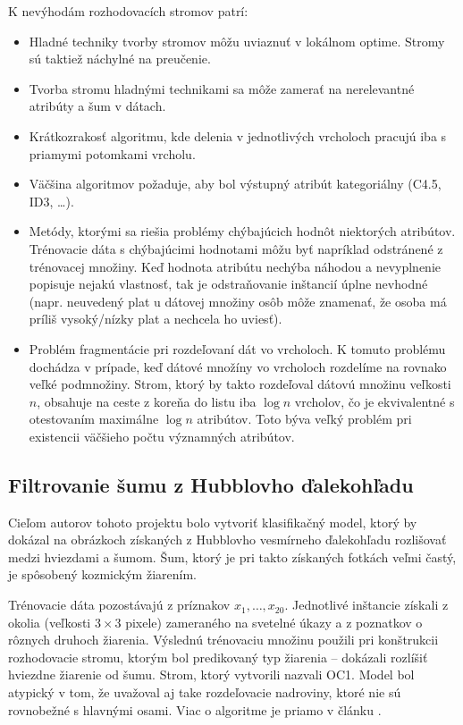 K nevýhodám rozhodovacích stromov patrí:
\begin{itemize}
\item Hladné techniky tvorby stromov môžu uviaznuť v lokálnom optime. Stromy sú taktiež náchylné na preučenie.
\item Tvorba stromu hladnými technikami sa môže zamerať na nerelevantné atribúty a šum v dátach.
\item Krátkozrakosť algoritmu, kde delenia v jednotlivých vrcholoch pracujú iba s priamymi potomkami vrcholu.
\item Väčšina algoritmov požaduje, aby bol výstupný atribút kategoriálny (C4.5, ID3, \ldots).
\item Metódy, ktorými sa riešia problémy chýbajúcich hodnôt niektorých atribútov. Trénovacie dáta s chýbajúcimi hodnotami môžu byť napríklad odstránené z trénovacej množiny. Keď hodnota atribútu nechýba náhodou a nevyplnenie popisuje nejakú vlastnosť, tak je odstraňovanie inštancií úplne nevhodné (napr. neuvedený plat u dátovej množiny osôb môže znamenať, že osoba má príliš vysoký/nízky plat a nechcela ho uviesť).
\item Problém fragmentácie pri rozdeľovaní dát vo vrcholoch. K tomuto problému dochádza v prípade, keď dátové množíny vo vrcholoch rozdelíme na rovnako veľké podmnožiny. Strom, ktorý by takto rozdeľoval dátovú množinu veľkosti $n$, obsahuje na ceste z koreňa do listu iba $\log n$ vrcholov, čo je ekvivalentné s otestovaním maximálne $\log n$ atribútov. Toto býva veľký problém pri existencii väčšieho počtu významných atribútov.
\end{itemize}

\subsection{Filtrovanie šumu z Hubblovho ďalekohľadu}\label{kap1:2.8:2.8.2:Hubble}
Cieľom autorov tohoto projektu \cite{online-astronomy} bolo vytvoriť klasifikačný model, ktorý by dokázal na obrázkoch získaných z Hubblovho vesmírneho ďalekohľadu rozlišovať medzi hviezdami a šumom. Šum, ktorý je pri takto získaných fotkách veľmi častý, je spôsobený kozmickým žiarením. 

Trénovacie dáta pozostávajú z príznakov $x_{1},\ldots,x_{20}$. Jednotlivé inštancie získali z okolia (veľkosti $3 \times 3$ pixele) zameraného na svetelné úkazy a z poznatkov o rôznych druhoch žiarenia. Výslednú trénovaciu množinu použili pri konštrukcii rozhodovacie stromu, ktorým bol predikovaný typ žiarenia -- dokázali rozlíšiť hviezdne žiarenie od šumu. Strom, ktorý vytvorili nazvali OC1. Model bol atypický v tom, že uvažoval aj take rozdeľovacie nadroviny, ktoré nie sú rovnobežné s hlavnými osami. Viac o algoritme je priamo v článku \cite[str. 281]{online-astronomy}.

